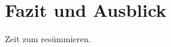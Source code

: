 \documentclass[../Abschlussarbeit.tex]{subfiles}
\begin{document}
\section{Fazit und Ausblick}
Zeit zum resümmieren.
\end{document}

